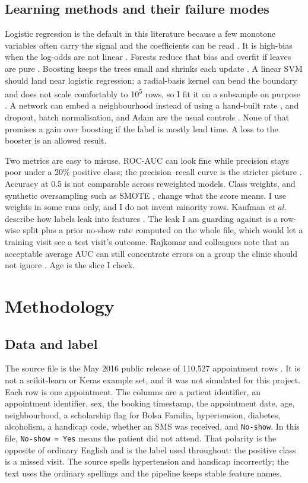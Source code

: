 \documentclass[journal]{IEEEtran}
\begin{document}
\subsection{Learning methods and their failure modes}
Logistic regression is the default in this literature because a few monotone variables often carry the signal and the coefficients can be read \cite{carreras2020}. It is high-bias when the log-odds are not linear \cite{hastie2009,geman1992}. Forests reduce that bias and overfit if leaves are pure \cite{breiman2001}. Boosting keeps the trees small and shrinks each update \cite{friedman2001}. A linear SVM should land near logistic regression; a radial-basis kernel can bend the boundary and does not scale comfortably to 10\textsuperscript{5} rows, so I fit it on a subsample on purpose \cite{cortes1995}. A network can embed a neighbourhood instead of using a hand-built rate \cite{goodfellow2016}, and dropout, batch normalisation, and Adam are the usual controls \cite{srivastava2014,ioffe2015,kingma2015}. None of that promises a gain over boosting if the label is mostly lead time. A loss to the booster is an allowed result.

Two metrics are easy to misuse. ROC-AUC can look fine while precision stays poor under a 20\% positive class; the precision--recall curve is the stricter picture \cite{saito2015}. Accuracy at 0.5 is not comparable across reweighted models. Class weights, and synthetic oversampling such as SMOTE \cite{chawla2002}, change what the score means. I use weights in some runs only, and I do not invent minority rows. Kaufman \emph{et al.} describe how labels leak into features \cite{kaufman2012}. The leak I am guarding against is a row-wise split plus a prior no-show rate computed on the whole file, which would let a training visit see a test visit's outcome. Rajkomar and colleagues note that an acceptable average AUC can still concentrate errors on a group the clinic should not ignore \cite{rajkomar2018}. Age is the slice I check.

\section{Methodology}
\subsection{Data and label}
The source file is the May 2016 public release of 110{,}527 appointment rows \cite{hoppen2016}. It is not a scikit-learn or Keras example set, and it was not simulated for this project. Each row is one appointment. The columns are a patient identifier, an appointment identifier, sex, the booking timestamp, the appointment date, age, neighbourhood, a scholarship flag for Bolsa Familia, hypertension, diabetes, alcoholism, a handicap code, whether an SMS was received, and \texttt{No-show}. In this file, \texttt{No-show = Yes} means the patient did not attend. That polarity is the opposite of ordinary English and is the label used throughout: the positive class is a missed visit. The source spells hypertension and handicap incorrectly; the text uses the ordinary spellings and the pipeline keeps stable feature names.
\end{document}
